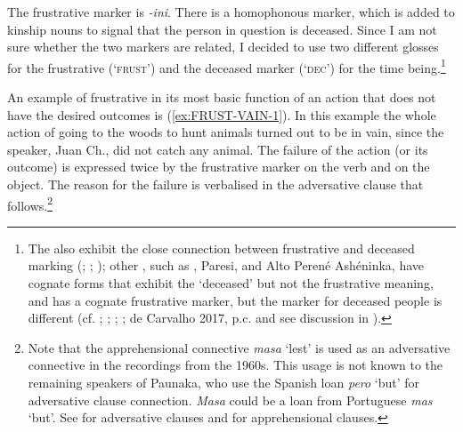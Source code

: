 The frustrative marker is \textit{-ini}. There is a homophonous marker, which is added to kinship nouns to signal that the person in question is deceased. Since I am not sure whether the two markers are related, I decided to use two different glosses for the frustrative (‘\textsc{frust}’) and the deceased marker (‘\textsc{dec}’) for the time being.\footnote{The  also exhibit the close connection between frustrative and deceased marking (\citealt[cf.][153, 157]{OlzaZubiri2004}; \citealt[35]{Jorda2014}; \citealt[80,81]{Rose2014a}); other , such as , Paresi, and Alto Perené Ashéninka, have cognate forms that exhibit the ‘deceased’ but not the frustrative meaning, and  has a cognate frustrative marker, but the marker for deceased people is different (cf. \citealt[115]{Danielsen2007}; \citealt[289]{Brandao2014}; \citealt[55, 84]{ButlerEkdahl2014}; \citealt[356]{Mihas2015}; de Carvalho 2017, p.c. and see discussion in ).}

An example of frustrative in its most basic function of an action that does not have the desired outcomes is (\ref{ex:FRUST-VAIN-1}). In this example the whole action of going to the woods to hunt animals turned out to be in vain, since the speaker, Juan Ch., did not catch any animal. The failure of the action (or its outcome) is expressed twice by the frustrative marker on the verb and on the object. The reason for the failure is verbalised in the adversative clause that follows.\footnote{Note that the apprehensional connective \textit{masa} ‘lest’ is used as an adversative connective in the recordings from the 1960s. This usage is not known to the remaining speakers of Paunaka, who use the Spanish loan \textit{pero} ‘but’ for adversative clause connection. \textit{Masa} could be a loan from Portuguese \textit{mas} ‘but’. See  for adversative clauses and  for apprehensional clauses.}

